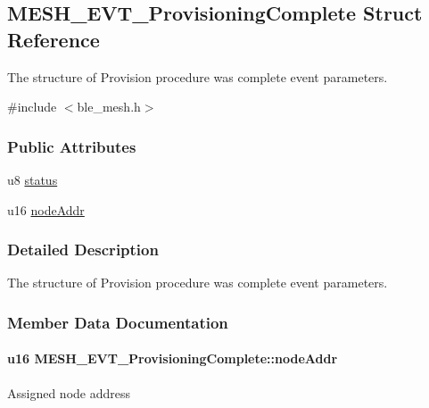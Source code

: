 \hypertarget{struct_m_e_s_h___e_v_t___provisioning_complete}{}\subsection{M\+E\+S\+H\+\_\+\+E\+V\+T\+\_\+\+Provisioning\+Complete Struct Reference}
\label{struct_m_e_s_h___e_v_t___provisioning_complete}


The structure of Provision procedure was complete event parameters.  




{\ttfamily \#include $<$ble\+\_\+mesh.\+h$>$}

\subsubsection*{Public Attributes}
\begin{DoxyCompactItemize}
\item 
u8 \hyperlink{struct_m_e_s_h___e_v_t___provisioning_complete_aa4bb0ce1638bf49a9e73efaa541c8176}{status}
\item 
u16 \hyperlink{struct_m_e_s_h___e_v_t___provisioning_complete_abf3120f7663786732e0c5e5e106a617e}{node\+Addr}
\end{DoxyCompactItemize}


\subsubsection{Detailed Description}
The structure of Provision procedure was complete event parameters. 

\subsubsection{Member Data Documentation}
\paragraph[{\texorpdfstring{node\+Addr}{nodeAddr}}]{\setlength{\rightskip}{0pt plus 5cm}u16 M\+E\+S\+H\+\_\+\+E\+V\+T\+\_\+\+Provisioning\+Complete\+::node\+Addr}\hypertarget{struct_m_e_s_h___e_v_t___provisioning_complete_abf3120f7663786732e0c5e5e106a617e}{}\label{struct_m_e_s_h___e_v_t___provisioning_complete_abf3120f7663786732e0c5e5e106a617e}
Assigned node address 
